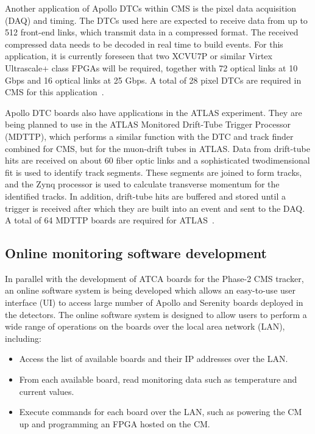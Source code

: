 Another application of Apollo DTCs within CMS is the pixel data acquisition (DAQ) and timing.
The DTCs used here are expected to receive data from up to 512 front-end links, which transmit
data in a compressed format. The received compressed data needs to be decoded in real time
to build events. For this application, it is currently foreseen that  two XCVU7P or similar Virtex 
Ultrascale+ class FPGAs will be required, together with 72 optical links at 10 Gbps and 16 optical 
links at 25 Gbps. A total of 28 pixel DTCs are required in CMS for this application~\cite{CMS:ApolloPaper}.

Apollo DTC boards also have applications in the ATLAS experiment. They are being planned to use
in the ATLAS  Monitored Drift-Tube Trigger Processor (MDTTP), which performs a similar function
with the DTC and track finder combined for CMS, but for the muon-drift tubes in ATLAS. Data from drift-tube
hits are received on about 60 fiber optic links and a sophisticated twodimensional fit is used to identify track segments. 
These segments are joined to form tracks, and
the Zynq processor is used to calculate transverse momentum for the identified tracks. In addition,
drift-tube hits are buffered and stored until a trigger is received after which they are built into an
event and sent to the DAQ. A total of 64 MDTTP boards are required for ATLAS~\cite{CMS:ApolloPaper}.

\subsection{Online monitoring software development}

In parallel with the development of ATCA boards for the Phase-2 CMS tracker, an online software system is being
developed which allows an easy-to-use user interface (UI) to access large number of Apollo and Serenity boards
deployed in the detectors. The online software system is designed to allow users to perform a wide range of 
operations on the boards over the local area network (LAN), including:

\begin{itemize}
    \item Access the list of available boards and their IP addresses over the LAN.
    \item From each available board, read monitoring data such as temperature and current values.
    \item Execute commands for each board over the LAN, such as powering the CM up and programming an FPGA hosted on the CM.
\end{itemize}

